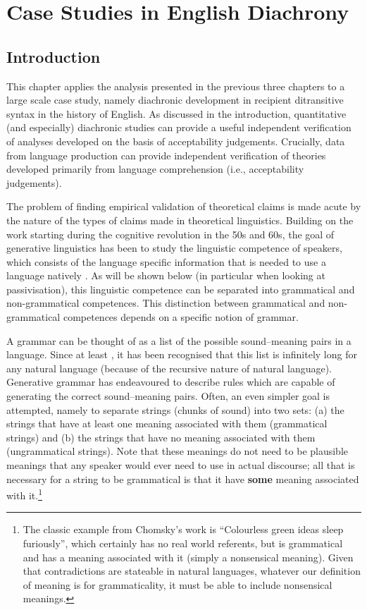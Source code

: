 \chapter{Case Studies in English Diachrony}\label{ch:diachron}
\section{Introduction}
This chapter applies the analysis presented in the previous three chapters to a large scale case study, namely diachronic development in recipient ditransitive syntax in the history of English. As discussed in the introduction, quantitative (and especially) diachronic studies can provide a useful independent verification of analyses developed on the basis of acceptability judgements. Crucially, data from language production can provide independent verification of theories developed primarily from language comprehension (i.e., acceptability judgements).

The problem of finding empirical validation of theoretical claims is made acute by the nature of the types of claims made in theoretical linguistics. Building on the work starting during the cognitive revolution in the 50s and 60s, the goal of generative linguistics has been to study the linguistic competence of speakers, which consists of the language specific information that is needed to use a language natively \citep{Chomsky.1981,Chomsky.1986}. As will be shown below (in particular when looking at passivisation), this linguistic competence can be separated into grammatical and non-grammatical competences. This distinction between grammatical and non-grammatical competences depends on a specific notion of grammar.

A grammar can be thought of as a list of the possible sound--meaning pairs in a language. Since at least \cite{Chomsky.1965}, it has been recognised that this list is infinitely long for any natural language (because of the recursive nature of natural language). Generative grammar has endeavoured to describe rules which are capable of generating the correct sound--meaning pairs. Often, an even simpler goal is attempted, namely to separate strings (chunks of sound) into two sets: (a) the strings that have at least one meaning associated with them (grammatical strings) and (b) the strings that have no meaning associated with them (ungrammatical strings). Note that these meanings do not need to be plausible meanings that any speaker would ever need to use in actual discourse; all that is necessary for a string to be grammatical is that it have \textbf{some} meaning associated with it.\footnote{The classic example from Chomsky's work is ``Colourless green ideas sleep furiously'', which certainly has no real world referents, but is grammatical and has a meaning associated with it (simply a nonsensical meaning). Given that contradictions are stateable in natural languages, whatever our definition of meaning is for grammaticality, it must be able to include nonsensical meanings.}

